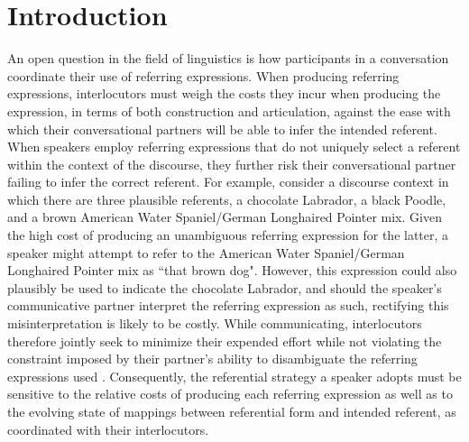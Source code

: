 \documentclass[11pt]{article}
\begin{document}
\section{Introduction}
An open question in the field of linguistics is how participants in a conversation coordinate their use of referring expressions. When producing referring expressions, interlocutors must weigh the costs they incur when producing the expression, in terms of both construction and articulation, against the ease with which their conversational partners will be able to infer the intended referent. When speakers employ referring expressions that do not uniquely select a referent within the context of the discourse, they further risk their conversational partner failing to infer the correct referent. For example, consider a discourse context in which there are three plausible referents, a chocolate Labrador, a black Poodle, and a brown American Water Spaniel/German Longhaired Pointer mix. Given the high cost of producing an unambiguous referring expression for the latter, a speaker might attempt to refer to the American Water Spaniel/German Longhaired Pointer mix as ``that brown dog". However, this expression could also plausibly be used to indicate the chocolate Labrador, and should the speaker's communicative partner interpret the referring expression as such, rectifying this misinterpretation is likely to be costly. While communicating, interlocutors therefore jointly seek to minimize their expended effort while not violating the constraint imposed by their partner's ability to disambiguate the referring expressions used \citep{benz2005}. Consequently, the referential strategy a speaker adopts must be sensitive to the relative costs of producing each referring expression as well as to the evolving state of mappings between referential form and intended referent, as coordinated with their interlocutors. 
\end{document}
